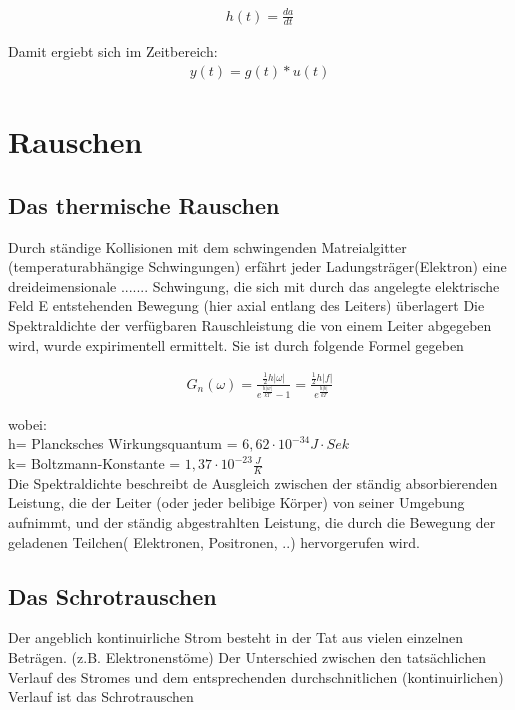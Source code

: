 \documentclass[a4paper,10pt]{article}
\begin{document}
\begin{align}
h(t)=\frac{da}{dt}
\end{align}

Damit ergiebt sich im Zeitbereich:
\begin{align}
y(t)=g(t)*u(t)
\end{align}




\section{Rauschen}

\subsection{Das thermische Rauschen}
Durch ständige Kollisionen mit dem schwingenden Matreialgitter (temperaturabhängige Schwingungen) erfährt
jeder Ladungsträger(Elektron) eine dreideimensionale ....... Schwingung, die sich mit durch das angelegte elektrische Feld E entstehenden Bewegung (hier axial entlang des Leiters) überlagert
Die Spektraldichte der verfügbaren Rauschleistung die von einem Leiter abgegeben wird, wurde expirimentell ermittelt.
Sie ist durch folgende Formel gegeben

\begin{align}
G_n(\omega)=\frac{\frac{1}{2}h|\omega|}{e^\frac{h |w|}{kT}-1}=\frac{\frac{1}{2}h|f|}{e^\frac{h|b|}{kT}}
\end{align}

wobei:\\ h= Plancksches Wirkungsquantum = $6,62\cdot 10^{-34} J\cdot Sek$\\
k= Boltzmann-Konstante = $1,37 \cdot 10^{-23} \frac{J}{K}$\\

Die Spektraldichte beschreibt de Ausgleich zwischen der ständig absorbierenden Leistung, die der Leiter 
(oder jeder belibige Körper) von seiner Umgebung aufnimmt, und der ständig abgestrahlten Leistung, die durch die Bewegung der geladenen Teilchen(
Elektronen, Positronen, ..) hervorgerufen wird.

\subsection{Das Schrotrauschen}
Der angeblich kontinuirliche Strom besteht in der Tat aus vielen einzelnen Beträgen. (z.B. Elektronenstöme)
Der Unterschied zwischen den tatsächlichen Verlauf des Stromes und dem entsprechenden durchschnitlichen
(kontinuirlichen) Verlauf ist das Schrotrauschen
\end{document}
